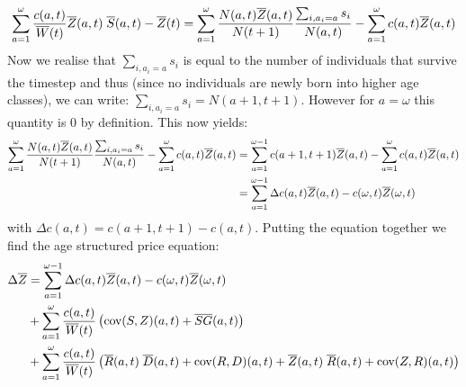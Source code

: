 \begin{equation}
\sum_{a=1}^{\omega} \frac{c(a,t)}{\overline{W}(t)} \overline{Z}(a,t)\;\overline{S}(a,t) - \overline{Z}(t) = \sum_{a=1}^{\omega} \frac{N(a,t)\overline{Z}(a,t)}{N(t+1)}\frac{\sum_{i,a_i=a} s_i}{N(a,t)} - \sum_{a=1}^{\omega} c(a,t) \overline{Z}(a,t)  
\end{equation}
Now we realise that $\sum_{i,a_i=a} s_i$ is equal to the number of individuals that survive the timestep and thus (since no individuals are newly born into higher age classes), we can write: $\sum_{i,a_i=a} s_i= N(a+1,t+1)$. However for $a=\omega$ this quantity is $0$ by definition. This now yields:
\begin{align}
\sum_{a=1}^{\omega} \frac{N(a,t)\overline{Z}(a,t)}{N(t+1)}\frac{\sum_{i,a_i=a} s_i}{N(a,t)} - \sum_{a=1}^{\omega} c(a,t) \overline{Z}(a,t) & = \sum_{a=1}^{\omega-1} c(a+1,t+1)\overline{Z}(a,t) - \sum_{a=1}^{\omega} c(a,t) \overline{Z}(a,t) \\ & = \sum_{a=1}^{\omega-1} \Delta c(a,t)\overline{Z}(a,t) - c(\omega,t) \overline{Z}(\omega,t)
\end{align}
with $\Delta c(a,t) = c(a+1,t+1) - c(a,t)$. Putting the equation together we find the age structured price equation:
\begin{align}
\Delta \overline{Z} & = \sum_{a=1}^{\omega-1} \Delta c(a,t)\overline{Z}(a,t) - c(\omega,t) \overline{Z}(\omega,t) \\ & + \sum_{a=1}^{\omega} \frac{c(a,t)}{\overline{W}(t)} \left( \text{cov}(S,Z)(a,t)  + \overline{SG}(a,t)\right) \notag \\ & + \sum_{a=1}^{\omega} \frac{c(a,t)}{\overline{W}(t)} \left( \overline{R}(a,t)\;\overline{D}(a,t) + \text{cov}(R,D)(a,t) + \overline{Z}(a,t)\;\overline{R}(a,t) + \text{cov}(Z,R)(a,t) \right) \notag
\label{appape4}
\end{align}

